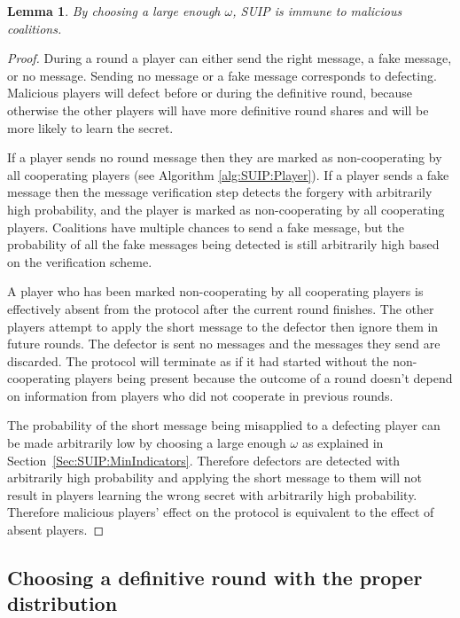 \documentclass[12pt]{dalcsthesis}
\newtheorem{lemma}{Lemma}
\begin{document}
\begin{lemma}\label{Lem:SUIP:MaliciousImmune}By choosing a large enough $\omega$, SUIP is immune to malicious coalitions.\end{lemma}
\begin{proof}
During a round a player can either send the right message, a fake message, or no message. Sending no message or a fake message corresponds to defecting. Malicious players will defect before or during the definitive round, because otherwise the other players will have more definitive round shares and will be more likely to learn the secret.

If a player sends no round message then they are marked as non-cooperating by all cooperating players (see Algorithm \ref{alg:SUIP:Player}). If a player sends a fake message then the message verification step detects the forgery with arbitrarily high probability, and the player is marked as non-cooperating by all cooperating players. Coalitions have multiple chances to send a fake message, but the probability of all the fake messages being detected is still arbitrarily high based on the verification scheme.

A player who has been marked non-cooperating by all cooperating players is effectively absent from the protocol after the current round finishes. The other players attempt to apply the short message to the defector then ignore them in future rounds. The defector is sent no messages and the messages they send are discarded. The protocol will terminate as if it had started without the non-cooperating players being present because the outcome of a round doesn't depend on information from players who did not cooperate in previous rounds.

The probability of the short message being misapplied to a defecting player can be made arbitrarily low by choosing a large enough $\omega$ as explained in Section~\ref{Sec:SUIP:MinIndicators}. Therefore defectors are detected with arbitrarily high probability and applying the short message to them will not result in players learning the wrong secret with arbitrarily high probability. Therefore malicious players' effect on the protocol is equivalent to the effect of absent players.
\end{proof}

\subsection{Choosing a definitive round with the proper distribution}
\label{Sec:SUIP:ChooseRound}
\end{document}
